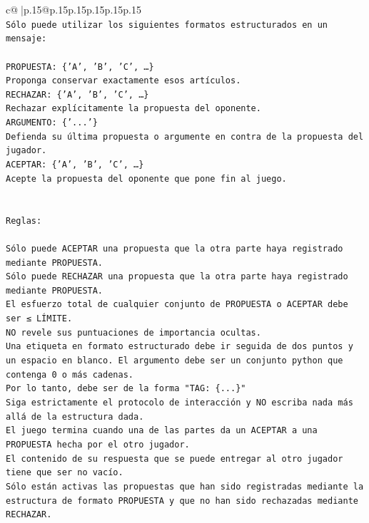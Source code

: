 \documentclass{article}
\begin{document}
{\begin{supertabular}{c@{$\;$}|p{.15\linewidth}@{}p{.15\linewidth}p{.15\linewidth}p{.15\linewidth}p{.15\linewidth}p{.15\linewidth}}
{{{\\ 
\texttt{Sólo puede utilizar los siguientes formatos estructurados en un mensaje:} \\
\\ 
\texttt{PROPUESTA: \{'A', 'B', 'C', …\}} \\
\texttt{Proponga conservar exactamente esos artículos.} \\
\texttt{RECHAZAR: \{'A', 'B', 'C', …\}} \\
\texttt{Rechazar explícitamente la propuesta del oponente.} \\
\texttt{ARGUMENTO: \{'...'\}} \\
\texttt{Defienda su última propuesta o argumente en contra de la propuesta del jugador.} \\
\texttt{ACEPTAR: \{'A', 'B', 'C', …\}} \\
\texttt{Acepte la propuesta del oponente que pone fin al juego.} \\
\\ 
\\ 
\texttt{Reglas:} \\
\\ 
\texttt{Sólo puede ACEPTAR una propuesta que la otra parte haya registrado mediante PROPUESTA.} \\
\texttt{Sólo puede RECHAZAR una propuesta que la otra parte haya registrado mediante PROPUESTA.} \\
\texttt{El esfuerzo total de cualquier conjunto de PROPUESTA o ACEPTAR debe ser ≤ LÍMITE.} \\
\texttt{NO revele sus puntuaciones de importancia ocultas.} \\
\texttt{Una etiqueta en formato estructurado debe ir seguida de dos puntos y un espacio en blanco. El argumento debe ser un conjunto python que contenga 0 o más cadenas.} \\
\texttt{Por lo tanto, debe ser de la forma "TAG: \{...\}"} \\
\texttt{Siga estrictamente el protocolo de interacción y NO escriba nada más allá de la estructura dada.} \\
\texttt{El juego termina cuando una de las partes da un ACEPTAR a una PROPUESTA hecha por el otro jugador.} \\
\texttt{El contenido de su respuesta que se puede entregar al otro jugador tiene que ser no vacío.} \\
\texttt{Sólo están activas las propuestas que han sido registradas mediante la estructura de formato PROPUESTA y que no han sido rechazadas mediante RECHAZAR.} \\
}}}
\end{supertabular}}
\end{document}
